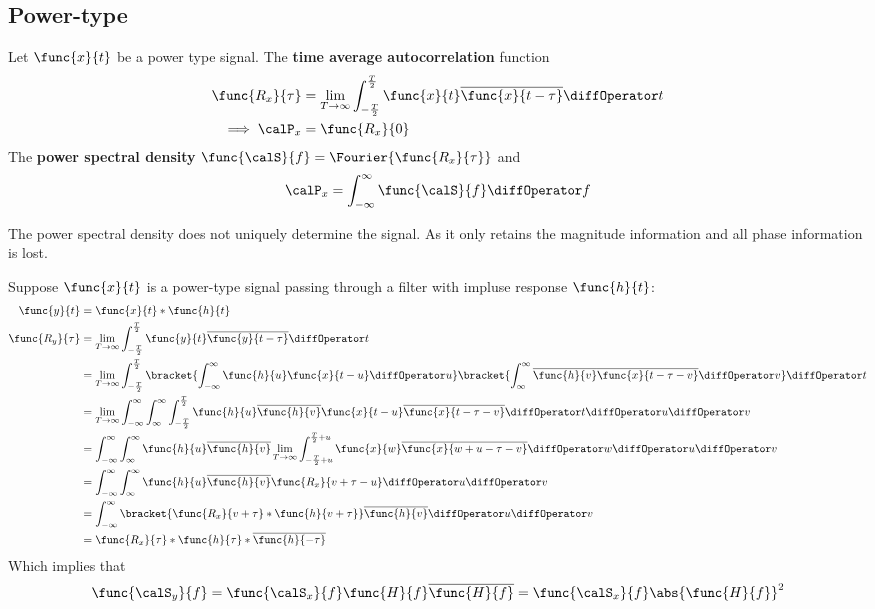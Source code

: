 \subsection{Power-type}
Let \(\func{x}{t}\) be a power type signal. The \textbf{time average autocorrelation} function 
\begin{align*}
    \func{R_{x}}{\tau} &= \lim_{T \to \infty} \int_{-\frac{T}{2}}^{\frac{T}{2}} \func{x}{t} \overline{\func{x}{t - \tau}} \diffOperator t\\
    \implies \calP_x &= \func{R_x}{0}
\end{align*}
The \textbf{power spectral density} \(\func{\calS}{f} = \Fourier{\func{R_x}{\tau}}\) and 
\begin{equation*}
    \calP_x = \int_{-\infty}^{\infty} \func{\calS}{f} \diffOperator f
\end{equation*}
\begin{remark}
    The power spectral density does not uniquely determine the signal. As it only retains the magnitude information and all phase information is lost.
\end{remark}
Suppose \(\func{x}{t}\) is a power-type signal passing through a filter with impluse response \(\func{h}{t}\):
\begin{align*}
    \func{y}{t} &= \func{x}{t} \ast \func{h}{t}\\
    \func{R_y}{\tau} &= \lim_{T \to \infty} \int_{-\frac{T}{2}}^{\frac{T}{2}} \func{y}{t} \overline{\func{y}{t - \tau}} \diffOperator t\\
    &= \lim_{T \to \infty} \int_{-\frac{T}{2}}^{\frac{T}{2}}\bracket{\int_{-\infty}^{\infty} \func{h}{u} \func{x}{t - u} \diffOperator u} \bracket{\int_{\infty}^{\infty} \overline{\func{h}{v}} \overline{\func{x}{t - \tau - v}} \diffOperator v }  \diffOperator t\\
    &= \lim_{T \to \infty} \int_{-\infty}^{\infty} \int_{\infty}^{\infty} \int_{-\frac{T}{2}}^{\frac{T}{2}}  \func{h}{u} \overline{\func{h}{v}}  \func{x}{t - u}  \overline{\func{x}{t - \tau - v}}  \diffOperator t \diffOperator u \diffOperator v\\
    &= \int_{-\infty}^{\infty} \int_{\infty}^{\infty}  \func{h}{u} \overline{\func{h}{v}} \lim_{T \to \infty}  \int_{-\frac{T}{2} + u}^{\frac{T}{2} +u} \func{x}{w}   \overline{\func{x}{w + u - \tau - v}}  \diffOperator w \diffOperator u \diffOperator v\\
    &= \int_{-\infty}^{\infty} \int_{\infty}^{\infty}  \func{h}{u} \overline{\func{h}{v}}\func{R_x}{v + \tau - u} \diffOperator u \diffOperator v\\
    &=  \int_{-\infty}^{\infty}   \bracket{\func{R_x}{v + \tau }  \ast \func{h}{v + \tau}} \overline{\func{h}{v}}\diffOperator u \diffOperator v\\
    &= \func{R_x}{\tau }  \ast \func{h}{\tau} \ast \overline{\func{h}{-\tau}}
\end{align*}
Which implies that 
\begin{equation*}
    \func{\calS_y}{f} = \func{\calS_x}{f} \func{H}{f} \overline{\func{H}{f}} = \func{\calS_x}{f} \abs{\func{H}{f}}^2
\end{equation*}
